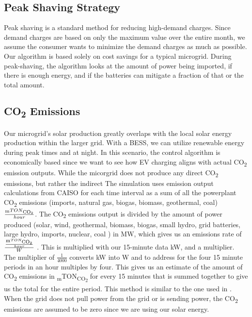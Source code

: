 \documentclass[conference]{IEEEtran}
\begin{document}
    \subsection{Peak Shaving Strategy}
       		Peak shaving is a standard method for reducing high-demand charges. Since demand charges are based on only the maximum value over the entire month, we assume the consumer wants to minimize the demand charges as much as possible. Our algorithm is based solely on cost savings for a typical microgrid. During peak-shaving, the algorithm looks at the amount of power being imported, if there is enough energy, and if the batteries can mitigate a fraction of that or the total amount.  
    \subsection{CO\textsubscript{2} Emissions}
        	Our microgrid's solar production greatly overlaps with the local solar energy production within the larger grid.  With a BESS, we can utilize renewable energy during peak times and at night. In this scenario, the control algorithm is economically based since we want to see how EV charging aligns with actual CO\textsubscript{2} emission outputs.  While the micorgrid does not produce any direct CO\textsubscript{2} emissions, but rather the indirect The simulation uses emission output calculations from CAISO for each time interval as a sum of all the powerplant CO\textsubscript{2} emissions (imports, natural gas, biogas, biomass, geothermal, coal) $\frac{\textsubscript{m}TON\textsubscript{CO\textsubscript{2}}}{hour}$. The CO\textsubscript{2} emissions output is divided by the amount of power produced (solar, wind, geothermal, biomass, biogas, small hydro, grid batteries, large hydro, imports, nuclear, coal ) in MW, which gives us an emissions rate of $\frac{\frac{\textsubscript{m}TON\textsubscript{CO\textsubscript{2}}}{hour}}{W}$ . This is multiplied with our 15-minute data kW, and a multiplier. The multiplier of  $\frac{1}{4000}$ converts kW into W and to address for the four 15 minute periods in an hour multiples by four.  This gives us an estimate of the amount of CO\textsubscript{2} emissions in \textsubscript{m}TON\textsubscript{CO\textsubscript{2}} for every 15 minutes that is summed together to give us the total for the entire period.  This method is similar to the one used in \cite{garrido2021dynamic}.  When the grid does not pull power from the grid or is sending power, the CO\textsubscript{2} emissions are assumed to be zero since we are using our solar energy.
\end{document}
